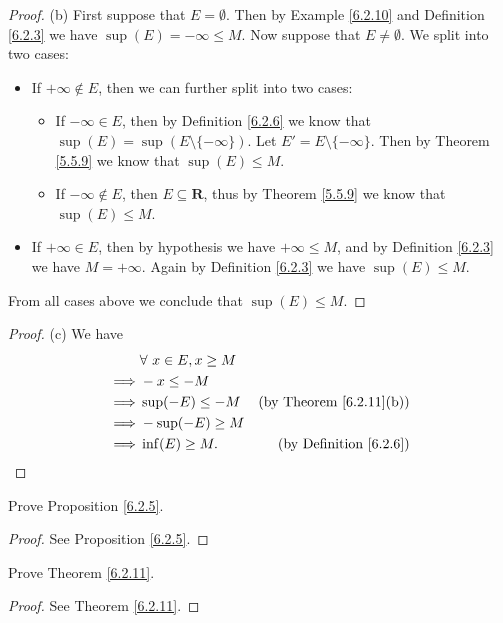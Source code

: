 \begin{proof}{(b)}
      First suppose that \(E = \emptyset\).
      Then by Example \ref{6.2.10} and Definition \ref{6.2.3} we have \(\sup(E) = -\infty \leq M\).
      Now suppose that \(E \neq \emptyset\).
      We split into two cases:
      \begin{itemize}
            \item If \(+\infty \not\in E\), then we can further split into two cases:
                  \begin{itemize}
                        \item If \(-\infty \in E\), then by Definition \ref{6.2.6} we know that \(\sup(E) = \sup(E \setminus \{-\infty\})\).
                              Let \(E' = E \setminus \{-\infty\}\).
                              Then by Theorem \ref{5.5.9} we know that \(\sup(E) \leq M\).
                        \item If \(-\infty \notin E\), then \(E \subseteq \mathbf{R}\), thus by Theorem \ref{5.5.9} we know that \(\sup(E) \leq M\).
                  \end{itemize}
            \item If \(+\infty \in E\), then by hypothesis we have \(+\infty \leq M\), and by Definition \ref{6.2.3} we have \(M = +\infty\).
                  Again by Definition \ref{6.2.3} we have \(\sup(E) \leq M\).
      \end{itemize}
      From all cases above we conclude that \(\sup(E) \leq M\).
\end{proof}

\begin{proof}{(c)}
      We have
      \begin{align*}
                     & \forall\ x \in E, x \geq M                                       \\
            \implies & -x \leq -M                                                       \\
            \implies & \sup(-E) \leq -M           & \text{(by Theorem \ref{6.2.11}(b))} \\
            \implies & -\sup(-E) \geq M                                                 \\
            \implies & \inf(E) \geq M.            & \text{(by Definition \ref{6.2.6})}
      \end{align*}
\end{proof}

\exercisesection

\begin{exercise}\label{ex 6.2.1}
      Prove Proposition \ref{6.2.5}.
\end{exercise}

\begin{proof}
      See Proposition \ref{6.2.5}.
\end{proof}

\begin{exercise}\label{ex 6.2.2}
      Prove Theorem \ref{6.2.11}.
\end{exercise}

\begin{proof}
      See Theorem \ref{6.2.11}.
\end{proof}